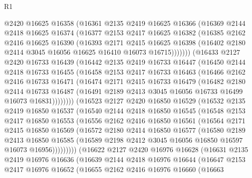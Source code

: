 \begin{lexlean}{R1}
\begin{coremodule}
      @2420
      @16625
      @16358
      (@16361
        @2135
        @2419
        @16625
        @16366
        (@16369
          @2144
          @2418
          @16625
          @16374
          (@16377
            @2153
            @2417
            @16625
            @16382
            (@16385
              @2162
              @2416
              @16625
              @16390
              (@16393
                @2171
                @2415
                @16625
                @16398
                (@16402 @2180 @2414 @3045 @16056 @16625 @16410 @16073 @16715)))))))
    (@16433
      @2127
      @2420
      @16733
      @16439
      (@16442
        @2135
        @2419
        @16733
        @16447
        (@16450
          @2144
          @2418
          @16733
          @16455
          (@16458
            @2153
            @2417
            @16733
            @16463
            (@16466
              @2162
              @2416
              @16733
              @16471
              (@16474
                @2171
                @2415
                @16733
                @16479
                (@16482
                  @2180
                  @2414
                  @16733
                  @16487
                  (@16491 @2189 @2413 @3045 @16056 @16733 @16499 @16073 @16831))))))))
    (@16523
      @2127
      @2420
      @16850
      @16529
      (@16532
        @2135
        @2419
        @16850
        @16537
        (@16540
          @2144
          @2418
          @16850
          @16545
          (@16548
            @2153
            @2417
            @16850
            @16553
            (@16556
              @2162
              @2416
              @16850
              @16561
              (@16564
                @2171
                @2415
                @16850
                @16569
                (@16572
                  @2180
                  @2414
                  @16850
                  @16577
                  (@16580
                    @2189
                    @2413
                    @16850
                    @16585
                    (@16589 @2198 @2412 @3045 @16056 @16850 @16597 @16073 @16956)))))))))
    (@16622
      @2127
      @2420
      @16976
      @16628
      (@16631
        @2135
        @2419
        @16976
        @16636
        (@16639
          @2144
          @2418
          @16976
          @16644
          (@16647
            @2153
            @2417
            @16976
            @16652
            (@16655
              @2162
              @2416
              @16976
              @16660
              (@16663

\end{coremodule}
\end{lexlean}
